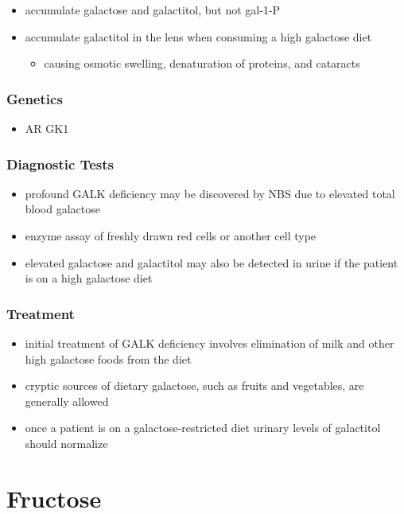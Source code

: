 \documentclass[12pt]{scrartcl}
\begin{document}

\begin{itemize}
\item accumulate galactose and galactitol, but not gal-1-P
\item accumulate galactitol in the lens when consuming a high galactose diet
\begin{itemize}
\item causing osmotic swelling, denaturation of proteins, and cataracts
\end{itemize}
\end{itemize}

\subsubsection{Genetics}
\label{sec:org56ba35c}
\begin{itemize}
\item AR GK1
\end{itemize}
\subsubsection{Diagnostic Tests}
\label{sec:org0a9bc62}
\begin{itemize}
\item profound GALK deficiency may be discovered by NBS due to elevated total blood galactose
\item enzyme assay of freshly drawn red cells or another cell type
\item elevated galactose and galactitol may also be detected in urine if
the patient is on a high galactose diet
\end{itemize}

\subsubsection{Treatment}
\label{sec:org52817f3}
\begin{itemize}
\item initial treatment of GALK deficiency involves elimination of milk
and other high galactose foods from the diet
\item cryptic sources of dietary galactose, such as fruits and vegetables,
are generally allowed
\item once a patient is on a galactose-restricted diet urinary levels of
galactitol should normalize
\end{itemize}
\section{Fructose}
\label{sec:orgc961b6c}
\end{document}
